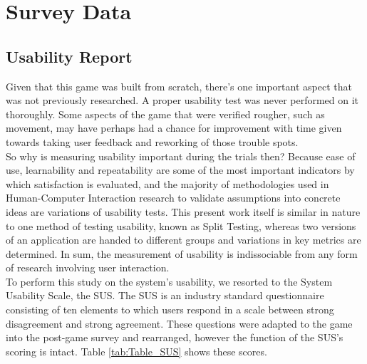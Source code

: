 \section{Survey Data} \label{sec:results_surveys}

\subsection{Usability Report} \label{sec:results_surveys_usability}
    Given that this game was built from scratch, there’s one important aspect that was not previously researched. A proper usability test was never performed on it thoroughly. Some aspects of the game that were verified rougher, such as movement, may have perhaps had a chance for improvement with time given towards taking user feedback and reworking of those trouble spots.\\
    So why is measuring usability important during the trials then? Because ease of use, learnability and repeatability are some of the most important indicators by which satisfaction is evaluated, and the majority of methodologies used in Human-Computer Interaction research to validate assumptions into concrete ideas are variations of usability tests. This present work itself is similar in nature to one method of testing usability, known as Split Testing, whereas two versions of an application are handed to different groups and variations in key metrics are determined. In sum, the measurement of usability is indissociable from any form of research involving user interaction.\\
    To perform this study on the system’s usability, we resorted to the System Usability Scale\cite{brooke1996sus}, the SUS. The SUS is an industry standard questionnaire consisting of ten elements to which users respond in a scale between strong disagreement and strong agreement. These questions were adapted to the game into the post-game survey and rearranged, however the function of the SUS’s scoring is intact. Table \ref{tab:Table_SUS} shows these scores.\\
